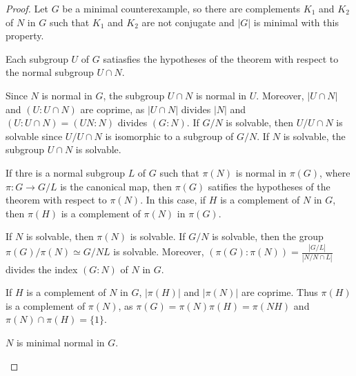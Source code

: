 \begin{proof}
	Let $G$ be a minimal counterexample, so there are complements $K_1$ and 
	$K_2$ of $N$ in $G$ such that $K_1$ and $K_2$ are not conjugate and $|G|$ is minimal with this
	property. 
	
	\begin{claim}
		Each subgroup $U$ of $G$ satiasfies the hypotheses of the theorem with
		respect to the normal subgroup $U\cap N$.
	\end{claim}
	
	Since $N$ is normal in $G$, the subgroup $U\cap N$ is normal in $U$. Moreover, $|U\cap N|$ and 
	$(U:U\cap N)$ are coprime, as $|U\cap N|$ divides $|N|$ and $(U:U\cap
	N)=(UN:N)$ divides $(G:N)$. If $G/N$ is solvable, then $U/U\cap N$
	is solvable since $U/U\cap N$ is isomorphic to a subgroup of $G/N$. If $N$ is
	solvable, the subgroup $U\cap N$ is solvable. 
	

	\begin{claim}
		If thre is a normal subgroup $L$ of $G$ such that $\pi(N)$ is normal in 
		$\pi(G)$, where $\pi\colon G\to G/L$ is the canonical map, then 
		$\pi(G)$ satifies the hypotheses of the theorem with respect to $\pi(N)$.
		In this case, if $H$ is a complement of $N$ in $G$, then $\pi(H)$ is a complement
		of $\pi(N)$ in $\pi(G)$.
	\end{claim}

	If $N$ is solvable, then $\pi(N)$ is solvable. If $G/N$ is solvable, then the group 
	$\pi(G)/\pi(N)\simeq G/NL$ is solvable. Moreover, 
	$(\pi(G):\pi(N))=\frac{|G/L|}{|N/N\cap L|}$ divides the index $(G:N)$ of $N$ in $G$. 
	
	If $H$ is a complement of $N$ in $G$, $|\pi(H)|$ and $|\pi(N)|$ are coprime.
	Thus $\pi(H)$ is a complement of $\pi(N)$, as 
	$\pi(G)=\pi(N)\pi(H)=\pi(NH)$ and 
	$\pi(N)\cap\pi(H)=\{1\}$. 

	\begin{claim}
		$N$ is minimal normal in $G$.
	\end{claim}


\end{proof}
